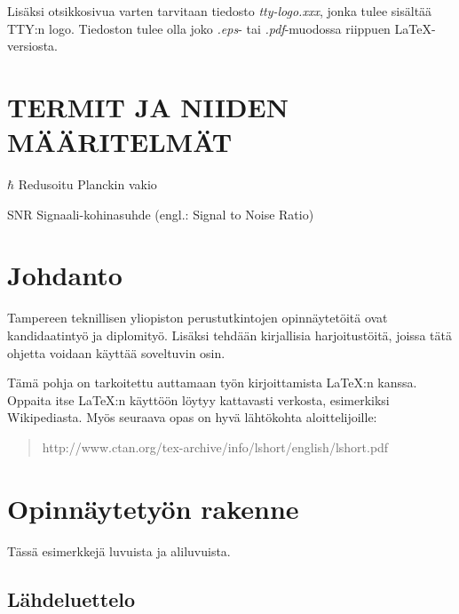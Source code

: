 \documentclass[12pt,a4paper,finnish]{vendor/tutthesis}
\begin{document}
Lisäksi otsikkosivua varten tarvitaan tiedosto \textit{tty-logo.xxx}, jonka
tulee sisältää TTY:n logo. Tiedoston tulee
olla joko \textit{.eps}- tai \textit{.pdf}-muodossa riippuen \LaTeX-versiosta.

\newpage
\renewcommand\contentsname{Sisällys} %
\tableofcontents
\newpage
\chapter*{TERMIT JA NIIDEN MÄÄRITELMÄT}


\begin{termiluettelo}

\item [$\hbar$] Redusoitu Planckin vakio
\item [SNR] Signaali-kohinasuhde (engl.: Signal to Noise Ratio)

\end{termiluettelo}


\newpage
\renewcommand{\chaptermark}[1]{\markboth{\thechapter. \ #1}{}}
\renewcommand{\sectionmark}[1]{\markright{}{}}
\lhead{\fancyplain{}{\leftmark}}


\chapter{Johdanto}

Tampereen teknillisen yliopiston perustutkintojen opinnäytetöitä ovat
kandidaatintyö ja diplomityö. Lisäksi tehdään kirjallisia
harjoitustöitä, joissa tätä ohjetta voidaan käyttää soveltuvin osin.

Tämä pohja on tarkoitettu auttamaan työn kirjoittamista \LaTeX:n
kanssa. Oppaita itse \LaTeX:n käyttöön löytyy kattavasti verkosta,
esimerkiksi Wikipediasta. Myös seuraava opas on hyvä lähtökohta
aloittelijoille:
\begin{quote}
http://www.ctan.org/tex-archive/info/lshort/english/lshort.pdf
\end{quote}

\chapter{Opinnäytetyön rakenne}

Tässä esimerkkejä luvuista ja aliluvuista.

\section{Lähdeluettelo}
\end{document}
